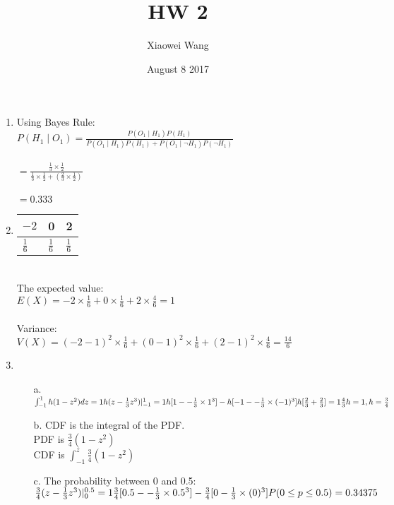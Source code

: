 \documentclass[12pt]{article}
\title{\vspace{-5.5cm}HW 2}
\author{Xiaowei Wang}
\date{August 8 2017}
\begin{document}
\maketitle


\begin{enumerate}
    \item Using Bayes Rule:
    \\ $P(H_{1}\mid O_{1})= \frac {P(O_{1}\mid H_{1})P(H_{1})}
    {P(O_{1}\mid H_{1})P(H_{1}) + P(O_{1}\mid\neg H_{1})P(\neg H_{1}) }$
    \\
    \\ $= \frac{ \frac{1}{3}\times \frac{1}{2}}
    {\frac{1}{3}\times \frac{1}{2}+ (\frac{2}{3} \times \frac{1}{2}) }$
    \\
    \\ $= 0.333 $

    \item
        \begin{tabular}{ L  L  L }
            $-2$ & 0 & 2 \\
            \hline\hline
            $\frac{1}{6}$ & $\frac{1}{6}$ & $\frac{1}{6}$
        \end{tabular}
        \\
        \text The expected value:
    \\$ E(\textit{X}) = -2 \times \frac{1}{6} + 0 \times \frac{1}{6} + 2 \times \frac{4}{6} = 1     $
    \\
    \\ Variance:
    \\ $ V(X) = (-2-1)^{2} \times \frac{1}{6} + (0-1)^{2} \times \frac{1}{6} + (2-1)^{2} \times \frac{4}{6} = \frac{14}{6}  $

    \item
        \begin{enumerate}
            \item [a.]
            $ \int_{-1}^{1} h(1-z^2) dz = 1 \\
            h(z- \frac{1}{3}z^3) \rvert_{-1}^{1} = 1 \\
            h [1- -\frac{1}{3} \times 1^3 ] - h [-1- -\frac{1}{3} \times (-1)^3 ] \\
            h[\frac{2}{3} + \frac{2}{3}] =1\\
            \frac{4}{3}h = 1,  h = \frac{3}{4}$ \\
            \item[b.]
            CDF is the integral of the PDF.\\
            PDF is $\frac{3}{4}(1-z^2)$ \\
            CDF is $   \int_{-1}^{z}\frac{3}{4}(1-z^2)   $ \\
            \item [c.]
            The probability between 0 and 0.5: \\
            $
            \frac{3}{4}(z- \frac{1}{3}z^3) \rvert_{0}^{0.5} = 1 \\
            \frac{3}{4} [0.5- -\frac{1}{3} \times 0.5^3 ] - \frac{3}{4} [0-\frac{1}{3} \times (0)^3 ] \\
            P(0 \leq p \leq 0.5) = 0.34375
            $


\end{enumerate}
\end{enumerate}
\end{document}
